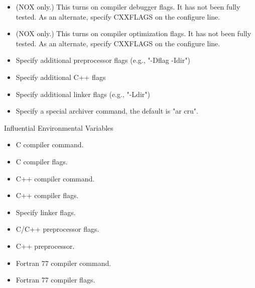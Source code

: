 \begin{itemize}
\item {} 

(NOX only.)  This turns on compiler debugger flags. It has 
not been fully tested. As an alternate, specify CXXFLAGS on the 
                 configure line.

\item {}

(NOX only.)  This turns on compiler optimization flags. It 
has not been fully tested. As an alternate, specify CXXFLAGS on the 
                 configure line. 

\item {}

Specify additional preprocessor flags (e.g., "-Dflag -Idir") 

\item {}

Specify additional C++ flags 

\item {}

Specify additional linker flags (e.g., "-Ldir") 

\item {}

Specify a special archiver command, the default is "ar cru". 
\end{itemize}

 Influential Environmental Variables

\begin{itemize}
\item {}

C compiler command.

\item {}

C compiler flags.

\item {}

C++ compiler command.

\item {}

C++ compiler flags.

\item {}

Specify linker flags.

\item {}

C/C++ preprocessor flags.

\item {}

C++ preprocessor.

\item {}

Fortran 77 compiler command.

\item {}

Fortran 77 compiler flags.
\end{itemize}

